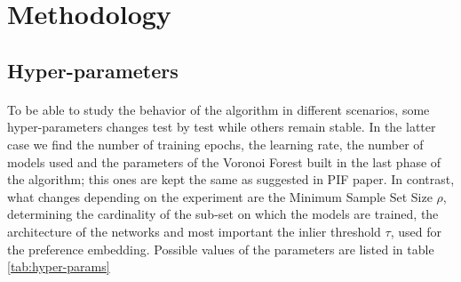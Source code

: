 \section{Methodology}
\subsection{Hyper-parameters}
\paragraph{}
To be able to study the behavior of the algorithm in different scenarios, some hyper-parameters changes test by test while others remain stable. In the latter case we find the number of training epochs, the learning rate, the number of models used and the parameters of the Voronoi Forest built in the last phase of the algorithm; this ones are kept the same as suggested in PIF paper. \newline
In contrast, what changes depending on the experiment are the Minimum Sample Set Size $\rho$, determining the cardinality of the sub-set on which the models are trained, the architecture of the networks and most important the inlier threshold $\tau$, used for the preference embedding. Possible values of the parameters are listed in table \ref{tab:hyper-params} \newline

